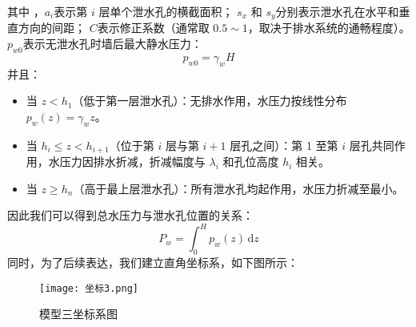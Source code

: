 \documentclass[withoutpreface,bwprint]{cumcmthesis}
\begin{document}
\par 
其中 ，$a_i$表示第 $i$ 层单个泄水孔的横截面积；
 $s_x$ 和 $s_y$分别表示泄水孔在水平和垂直方向的间距；
$C$表示修正系数（通常取 $0.5 \sim 1$，取决于排水系统的通畅程度）。
$p_{w0}$表示无泄水孔时墙后最大静水压力：$$p_{w0} = \gamma_w H$$并且：
    \begin{itemize}
        \item 当 $z < h_1$（低于第一层泄水孔）：无排水作用，水压力按线性分布 $p_w(z) = \gamma_w z$。
        \item 当 $h_i \leq z < h_{i+1}$（位于第 $i$ 层与第 $i+1$ 层孔之间）：第 1 至第 $i$ 层孔共同作用，水压力因排水折减，折减幅度与 $\lambda_i$ 和孔位高度 $h_i$ 相关。
        \item 当 $z \geq h_n$（高于最上层泄水孔）：所有泄水孔均起作用，水压力折减至最小。
    \end{itemize}
\par
因此我们可以得到总水压力与泄水孔位置的关系：
    \begin{equation}
        P_w = \int_{0}^{H} p_w(z) \, \mathrm{d} z
    \end{equation}
同时，为了后续表达，我们建立直角坐标系，如下图所示：
    \begin{figure}[H]
    \centering
    \texttt{[image: 坐标3.png]}
    \caption{模型三坐标系图}
    \label{fig:模型三坐标系图}
    \end{figure}
\end{document}
